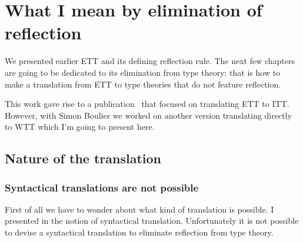 \chapter{What I mean by elimination of reflection}

We presented earlier \acrshort{ETT} and its defining reflection rule.
%
%
The next few chapters are going to be dedicated to its elimination from type
theory: that is how to make a translation from \acrshort{ETT} to type theories
that do not feature reflection.

This work gave rise to a publication~ that
focused on translating \acrshort{ETT} to \acrshort{ITT}.
However, with Simon Boulier we worked on another version translating directly to
\acrshort{WTT} which I'm going to present here.

\section{Nature of the translation}

\subsection{Syntactical translations are not possible}

First of all we have to wonder about what kind of translation is possible.
I presented in  the notion of syntactical translation.
Unfortunately it is not possible to devise a syntactical translation to
eliminate reflection from type theory.

